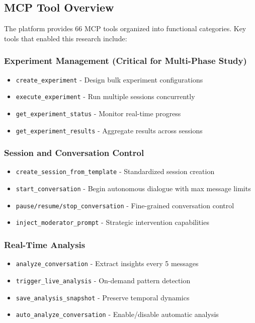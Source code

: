 \documentclass[11pt,letterpaper]{article}
\begin{document}
\subsection{MCP Tool Overview}

The platform provides 66 MCP tools organized into functional categories. Key tools that enabled this research include:

\subsubsection{Experiment Management (Critical for Multi-Phase Study)}
\begin{itemize}
    \item \texttt{create\_experiment} - Design bulk experiment configurations
    \item \texttt{execute\_experiment} - Run multiple sessions concurrently
    \item \texttt{get\_experiment\_status} - Monitor real-time progress
    \item \texttt{get\_experiment\_results} - Aggregate results across sessions
\end{itemize}

\subsubsection{Session and Conversation Control}
\begin{itemize}
    \item \texttt{create\_session\_from\_template} - Standardized session creation
    \item \texttt{start\_conversation} - Begin autonomous dialogue with max message limits
    \item \texttt{pause/resume/stop\_conversation} - Fine-grained conversation control
    \item \texttt{inject\_moderator\_prompt} - Strategic intervention capabilities
\end{itemize}

\subsubsection{Real-Time Analysis}
\begin{itemize}
    \item \texttt{analyze\_conversation} - Extract insights every 5 messages
    \item \texttt{trigger\_live\_analysis} - On-demand pattern detection
    \item \texttt{save\_analysis\_snapshot} - Preserve temporal dynamics
    \item \texttt{auto\_analyze\_conversation} - Enable/disable automatic analysis
\end{itemize}
\end{document}
